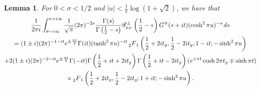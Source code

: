 \documentclass[11pt,a4paper]{amsart}
\newcommand{\Gscr}{\mathscr{G}}
\numberwithin{equation}{section}
\newtheorem{lemma}[equation]{Lemma}
\theoremstyle{remark}
\theoremstyle{definition}
\begin{document}
\begin{lemma}
For $0 < \sigma < 1/2$ and $|u| < \frac{1}{\pi} \log(1 + \sqrt{2})$, we have that
\begin{multline}
\label{eqn:contourintegral1}
\frac{1}{2\pi i} \int_{\sigma - i\infty}^{\sigma + i\infty} \frac{1}{\sqrt{\pi}} (2\pi)^{-2s} \frac{\Gamma(s)}{\Gamma\left(\frac{1}{2} - s\right)} \Gscr_{\mu_F}^{\pm}\left(\frac{1}{2} - s\right) G^{\mp}(s + it) (\cosh^2 \pi u)^{-s} \, ds	\\
= (1 \pm i) (2\pi)^{-1 - it} e^{\pm \frac{\pi t}{2}} \Gamma(it) (\tanh^2 \pi u)^{-it} \prescript{}{2}{F}_1\left(\frac{1}{2} + 2it_g,\frac{1}{2} - 2it_g;1 - it; -\sinh^2 \pi u\right)	\\
+ 2(1 \pm i) (2\pi)^{-2 - it} e^{\pm \frac{\pi t}{2}} \Gamma(-it) \Gamma\left(\frac{1}{2} + it + 2it_g\right) \Gamma\left(\frac{1}{2} + it - 2it_g\right) (e^{\mp \pi t} \cosh 2\pi t_g \mp \sinh \pi t)	\\
\times \prescript{}{2}{F}_1\left(\frac{1}{2} + 2it_g,\frac{1}{2} - 2it_g;1 + it; -\sinh^2 \pi u\right).
\end{multline}
\end{lemma}
\end{document}
